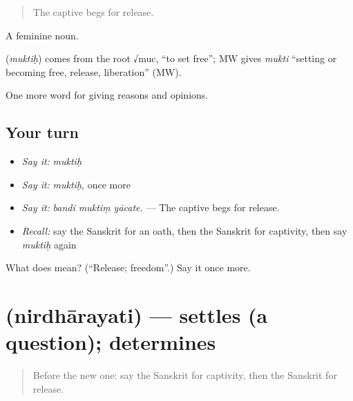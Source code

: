 \begin{quote}
The captive begs for release.
\end{quote}

A feminine noun.

\begin{cousinweb}
\textbf{} (\emph{muktiḥ}) comes from the root √muc, \textquotedblleft{}to set free\textquotedblright{}; MW gives \emph{mukti} \textquotedblleft{}setting or becoming free, release, liberation\textquotedblright{} (MW).
\end{cousinweb}

\begin{grammarlens}[title={What you've built}]
One more word for giving reasons and opinions.
\end{grammarlens}

\subsection*{Your turn}
\begin{itemize}
\raggedright
  \item \emph{Say it:} \emph{muktiḥ}
  \item \emph{Say it:} \emph{muktiḥ}, once more
  \item \emph{Say it:} \emph{bandī muktiṃ yācate.} — The captive begs for release.
  \item \emph{Recall:} say the Sanskrit for an oath, then the Sanskrit for captivity, then say \emph{muktiḥ} again
\end{itemize}

\begin{tcolorbox}[breakable,colback=teal!4,colframe=teal!35!black,title={Before you move on}]
What does  mean? (\textquotedblleft{}Release; freedom\textquotedblright{}.) Say it once more.
\end{tcolorbox}
\section[\texorpdfstring{\sk{निर्धारयति} (nirdhārayati)}{निर्धारयति (nirdhārayati)}]{ (nirdhārayati) — settles (a question); determines}

\label{lesson:SA-C350-nirdharayati}



\begin{quote}
Before the new one: say the Sanskrit for captivity, then the Sanskrit for release.
\end{quote}

